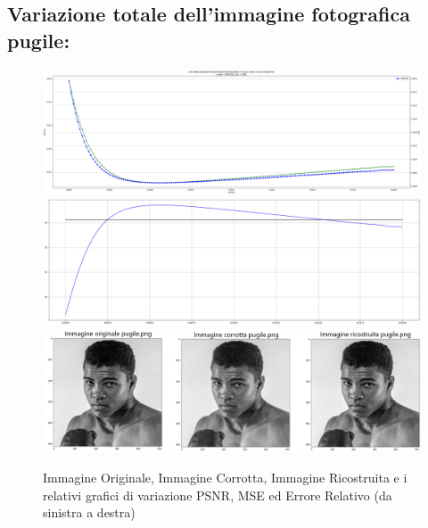 \subsection{Variazione totale dell'immagine fotografica pugile:}
\begin{figure}[H]
    \centering
    \includegraphics[width=\textwidth]{IMMAGINI_RELAZIONE/graficoPugileTOTVAR_ERRREL&MSE.png}
    \includegraphics[width=\textwidth]{IMMAGINI_RELAZIONE/graficoPugileTOTVAR_PSNR&suaMedia.png}
    \includegraphics[width=\textwidth]{imgRicostruzione/ricostruzionePugile_TOTVAR_maxPSNR33.70.png}
    \caption{Immagine Originale, Immagine Corrotta, Immagine Ricostruita e i relativi grafici di variazione PSNR, MSE ed Errore Relativo (da sinistra a destra)}
\end{figure}

